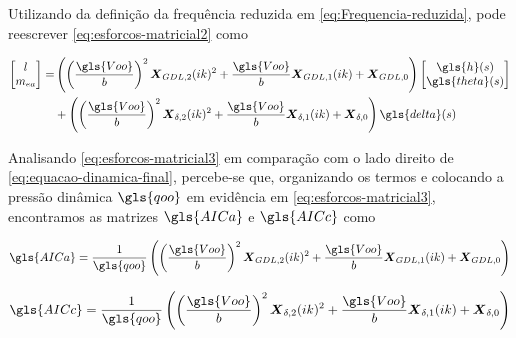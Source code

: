 Utilizando da definição da frequência reduzida em \eqref{eq:Frequencia-reduzida}, pode reescrever \eqref{eq:esforcos-matricial2} como

\begin{align}\label{eq:esforcos-matricial3}
\begin{split}
    \begin{bmatrix}
        l \\ m_{ea}
    \end{bmatrix} = &\left(
    \left(\frac{\gls{Voo}}{b}\right)^{2}\boldsymbol{X}_{GDL,2}(ik)^{2} + \frac{\gls{Voo}}{b}\boldsymbol{X}_{GDL,1}(ik) + \boldsymbol{X}_{GDL,0} \right)
    \begin{bmatrix}
        \gls{h}(s) \\ \gls{theta}(s)
    \end{bmatrix} \\ &+
    \left( \left(\frac{\gls{Voo}}{b}\right)^{2}\boldsymbol{X}_{\delta,2}(ik)^{2} + \frac{\gls{Voo}}{b}\boldsymbol{X}_{\delta,1}(ik) + \boldsymbol{X}_{\delta,0} \right) \gls{delta}(s)
\end{split}
\end{align}

Analisando \eqref{eq:esforcos-matricial3} em comparação com o lado direito de \eqref{eq:equacao-dinamica-final}, percebe-se que, organizando os termos e colocando a pressão dinâmica $\gls{qoo}$ em evidência em \eqref{eq:esforcos-matricial3}, encontramos as matrizes $\gls{AICa}$ e $\gls{AICc}$ como

\begin{equation}\label{eq:AICa-definica}
    \gls{AICa} = \frac{1}{\gls{qoo}}\left(
    \left(\frac{\gls{Voo}}{b}\right)^{2}\boldsymbol{X}_{GDL,2}(ik)^{2} + \frac{\gls{Voo}}{b}\boldsymbol{X}_{GDL,1}(ik) + \boldsymbol{X}_{GDL,0} \right)
\end{equation}

\begin{equation}\label{eq:AICc-definica}
    \gls{AICc} = \frac{1}{\gls{qoo}}\left( \left(\frac{\gls{Voo}}{b}\right)^{2}\boldsymbol{X}_{\delta,2}(ik)^{2} + \frac{\gls{Voo}}{b}\boldsymbol{X}_{\delta,1}(ik) + \boldsymbol{X}_{\delta,0} \right)
\end{equation}
